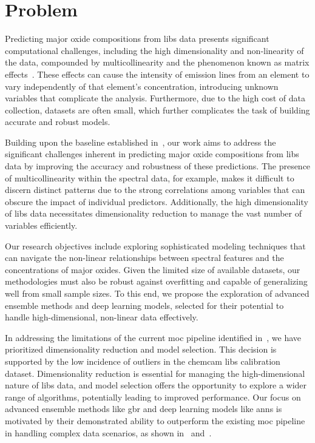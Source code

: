 \section{Problem}
\label{sec:problem_definition}

Predicting major oxide compositions from \gls{libs} data presents significant computational challenges, including the high dimensionality and non-linearity of the data, compounded by multicollinearity and the phenomenon known as matrix effects~\cite{andersonImprovedAccuracyQuantitative2017}.
These effects can cause the intensity of emission lines from an element to vary independently of that element's concentration, introducing unknown variables that complicate the analysis.
Furthermore, due to the high cost of data collection, datasets are often small, which further complicates the task of building accurate and robust models.

Building upon the baseline established in~\citet{p9_paper}, our work aims to address the significant challenges inherent in predicting major oxide compositions from \gls{libs} data by improving the accuracy and robustness of these predictions.
The presence of multicollinearity within the spectral data, for example, makes it difficult to discern distinct patterns due to the strong correlations among variables that can obscure the impact of individual predictors.
Additionally, the high dimensionality of \gls{libs} data necessitates dimensionality reduction to manage the vast number of variables efficiently.

Our research objectives include exploring sophisticated modeling techniques that can navigate the non-linear relationships between spectral features and the concentrations of major oxides.
Given the limited size of available datasets, our methodologies must also be robust against overfitting and capable of generalizing well from small sample sizes.
To this end, we propose the exploration of advanced ensemble methods and deep learning models, selected for their potential to handle high-dimensional, non-linear data effectively.

In addressing the limitations of the current \gls{moc} pipeline identified in~\citet{p9_paper}, we have prioritized dimensionality reduction and model selection.
This decision is supported by the low incidence of outliers in the \gls{chemcam} \gls{libs} calibration dataset.
Dimensionality reduction is essential for managing the high-dimensional nature of \gls{libs} data, and model selection offers the opportunity to explore a wider range of algorithms, potentially leading to improved performance.
Our focus on advanced ensemble methods like \gls{gbr} and deep learning models like \gls{ann}s is motivated by their demonstrated ability to outperform the existing \gls{moc} pipeline in handling complex data scenarios, as shown in~\citet{p9_paper} and~\citet{andersonPostlandingMajorElement2022}.

